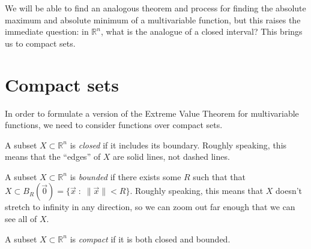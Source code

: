 \documentclass{ximera}
\begin{document}
We will be able to find an analogous theorem and process for finding the absolute maximum and absolute minimum of a multivariable function, but this raises the immediate question: in $\mathbb{R}^n$, what is the analogue of a closed interval? This brings us to compact sets.

\section*{Compact sets}

In order to formulate a version of the Extreme Value Theorem for multivariable functions, we need to consider functions over compact sets.

\begin{definition}
A subset $X\subset\mathbb{R}^n$ is \emph{closed} if it includes its boundary. Roughly speaking, this means that the ``edges'' of $X$ are solid lines, not dashed lines.

A subset $X\subset\mathbb{R}^n$ is \emph{bounded} if there exists some $R$ such that that $X\subset B_R(\vec{0}) = \{\vec{x}\;:\;\|\vec{x}\|<R\}$. Roughly speaking, this means that $X$ doesn't stretch to infinity in any direction, so we can zoom out far enough that we can see all of $X$.

A subset $X\subset\mathbb{R}^n$ is \emph{compact} if it is both closed and bounded.
\end{definition}
\end{document}
